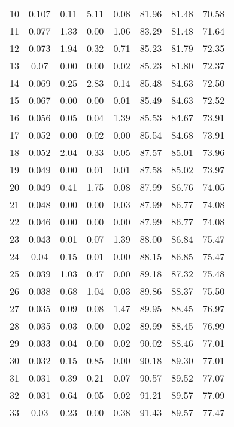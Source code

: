 \begin{longtable}{cccccccc}
    10    & 0.107 & 0.11  & 5.11  & 0.08  & 81.96 & 81.48 & 70.58 \\
    11    & 0.077 & 1.33  & 0.00  & 1.06  & 83.29 & 81.48 & 71.64 \\
    12    & 0.073 & 1.94  & 0.32  & 0.71  & 85.23 & 81.79 & 72.35 \\
    13    & 0.07  & 0.00  & 0.00  & 0.02  & 85.23 & 81.80 & 72.37 \\
    14    & 0.069 & 0.25  & 2.83  & 0.14  & 85.48 & 84.63 & 72.50 \\
    15    & 0.067 & 0.00  & 0.00  & 0.01  & 85.49 & 84.63 & 72.52 \\
    16    & 0.056 & 0.05  & 0.04  & 1.39  & 85.53 & 84.67 & 73.91 \\
    17    & 0.052 & 0.00  & 0.02  & 0.00  & 85.54 & 84.68 & 73.91 \\
    18    & 0.052 & 2.04  & 0.33  & 0.05  & 87.57 & 85.01 & 73.96 \\
    19    & 0.049 & 0.00  & 0.01  & 0.01  & 87.58 & 85.02 & 73.97 \\
    20    & 0.049 & 0.41  & 1.75  & 0.08  & 87.99 & 86.76 & 74.05 \\
    21    & 0.048 & 0.00  & 0.00  & 0.03  & 87.99 & 86.77 & 74.08 \\
    22    & 0.046 & 0.00  & 0.00  & 0.00  & 87.99 & 86.77 & 74.08 \\
    23    & 0.043 & 0.01  & 0.07  & 1.39  & 88.00 & 86.84 & 75.47 \\
    24    & 0.04  & 0.15  & 0.01  & 0.00  & 88.15 & 86.85 & 75.47 \\
    25    & 0.039 & 1.03  & 0.47  & 0.00  & 89.18 & 87.32 & 75.48 \\
    26    & 0.038 & 0.68  & 1.04  & 0.03  & 89.86 & 88.37 & 75.50 \\
    27    & 0.035 & 0.09  & 0.08  & 1.47  & 89.95 & 88.45 & 76.97 \\
    28    & 0.035 & 0.03  & 0.00  & 0.02  & 89.99 & 88.45 & 76.99 \\
    29    & 0.033 & 0.04  & 0.00  & 0.02  & 90.02 & 88.46 & 77.01 \\
    30    & 0.032 & 0.15  & 0.85  & 0.00  & 90.18 & 89.30 & 77.01 \\
    31    & 0.031 & 0.39  & 0.21  & 0.07  & 90.57 & 89.52 & 77.07 \\
    32    & 0.031 & 0.64  & 0.05  & 0.02  & 91.21 & 89.57 & 77.09 \\
    33    & 0.03  & 0.23  & 0.00  & 0.38  & 91.43 & 89.57 & 77.47 \\

\end{longtable}
